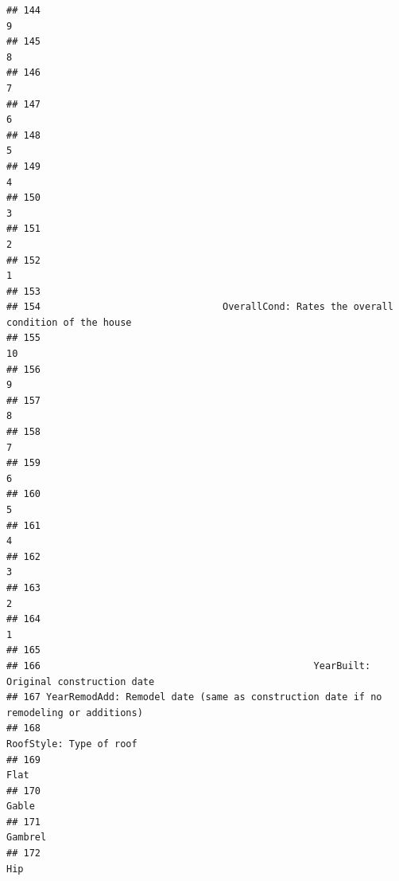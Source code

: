 \documentclass[
]{article}
\begin{document}
\begin{verbatim}
## 144                                                                                    9
## 145                                                                                    8
## 146                                                                                    7
## 147                                                                                    6
## 148                                                                                    5
## 149                                                                                    4
## 150                                                                                    3
## 151                                                                                    2
## 152                                                                                    1
## 153                                                                                     
## 154                                OverallCond: Rates the overall condition of the house
## 155                                                                                   10
## 156                                                                                    9
## 157                                                                                    8
## 158                                                                                    7
## 159                                                                                    6
## 160                                                                                    5
## 161                                                                                    4
## 162                                                                                    3
## 163                                                                                    2
## 164                                                                                    1
## 165                                                                                     
## 166                                                YearBuilt: Original construction date
## 167 YearRemodAdd: Remodel date (same as construction date if no remodeling or additions)
## 168                                                              RoofStyle: Type of roof
## 169                                                                                 Flat
## 170                                                                                Gable
## 171                                                                              Gambrel
## 172                                                                                  Hip

\end{verbatim}
\end{document}
